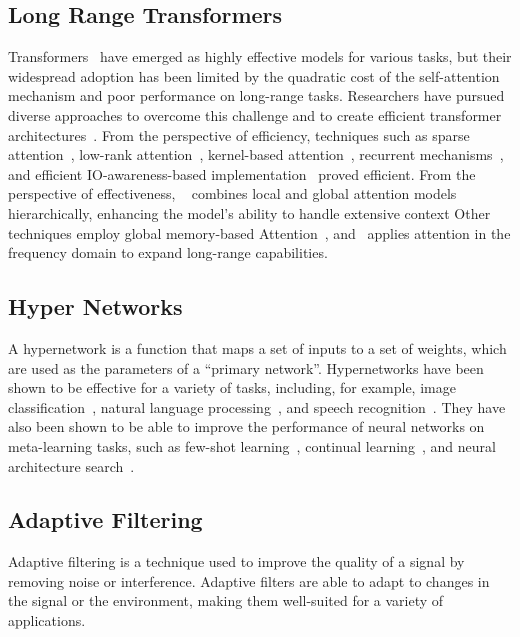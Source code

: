 \documentclass[11pt]{article}
\begin{document}
\subsection{Long Range Transformers}
Transformers~\cite{attention_is_all_u_need}  have emerged as highly effective models for various tasks, but their widespread adoption has been limited by the quadratic cost of the self-attention mechanism and poor performance on long-range tasks. Researchers have pursued diverse approaches to overcome this challenge and to create efficient transformer architectures~\cite{fournier2021practical,tay2022efficient}. From the perspective of efficiency,
techniques such as sparse attention~\cite{child2019generating}, low-rank attention~\cite{wang2020linformer,winata2020lightweight}, kernel-based attention~\cite{choromanski2020rethinking}, recurrent mechanisms~\cite{hutchins2022block,dai2019transformer}, and efficient IO-awareness-based implementation~\cite{dao2022flashattention} proved efficient. From the perspective of effectiveness, ~\cite{yu2023megabyte, ivgi2023efficient} combines local and global attention models hierarchically, enhancing the model's ability to handle extensive context
 Other techniques employ global memory-based Attention~\cite{gupta2020gmat,al2022global,burtsevmemory}, and~\cite{zhou2022fedformer} applies attention in the frequency domain to expand long-range capabilities. 









\subsection{Hyper Networks}
A hypernetwork \cite{ha2016hypernetworks} is a function that maps a set of inputs to a set of weights, which are used as the parameters of a ``primary network''. Hypernetworks have been shown to be effective for a variety of tasks, including, for example, image classification~\citep{lutati2022ocd}, natural language processing~\cite{he2022hyperprompt}, and speech recognition~\cite{szatkowski2022hypersound}. They have also been shown to be able to improve the performance of neural networks on meta-learning tasks, such as few-shot learning~\cite{bertinetto2016learning}, continual learning~\cite{von2019continual}, and neural architecture search~\cite{zhang2019graph}.

\subsection{Adaptive Filtering}
Adaptive filtering is a technique used to improve the quality of a signal by removing noise or interference. Adaptive filters are able to adapt to changes in the signal or the environment, making them well-suited for a variety of applications. 
\end{document}
